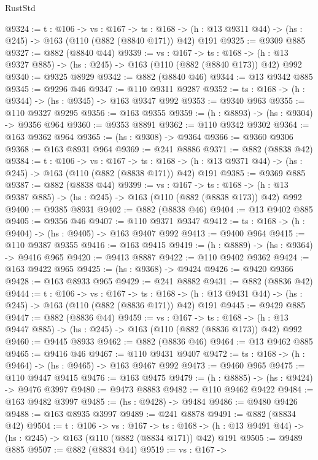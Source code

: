 \begin{lexlean}{RustStd}
\begin{coremodule}
@9324 := {t : @106} ->
  {vs : @167} ->
  {ts : @168} -> (h : @13 @9311 @44) -> (hs : @245) -> @163 (@110 (@882 (@8840 @171)) @42) @191
@9325 := @9309 @885
@9327 := @882 (@8840 @44)
@9339 := {vs : @167} ->
  {ts : @168} -> (h : @13 @9327 @885) -> (hs : @245) -> @163 (@110 (@882 (@8840 @173)) @42) @992
@9340 := @9325 @8929
@9342 := @882 (@8840 @46)
@9344 := @13 @9342 @885
@9345 := @9296 @46
@9347 := @110 @9311 @9287
@9352 := {ts : @168} -> (h : @9344) -> (hs : @9345) -> @163 @9347 @992
@9353 := @9340 @963
@9355 := @110 @9327 @9295
@9356 := @163 @9355
@9359 := (h : @8893) -> (hs : @9304) -> @9356 @964
@9360 := @9353 @8891
@9362 := @110 @9342 @9302
@9364 := @163 @9362 @964
@9365 := (hs : @9308) -> @9364
@9366 := @9360 @9306
@9368 := @163 @8931 @964
@9369 := @241 @8886
@9371 := @882 (@8838 @42)
@9384 := {t : @106} ->
  {vs : @167} ->
  {ts : @168} -> (h : @13 @9371 @44) -> (hs : @245) -> @163 (@110 (@882 (@8838 @171)) @42) @191
@9385 := @9369 @885
@9387 := @882 (@8838 @44)
@9399 := {vs : @167} ->
  {ts : @168} -> (h : @13 @9387 @885) -> (hs : @245) -> @163 (@110 (@882 (@8838 @173)) @42) @992
@9400 := @9385 @8931
@9402 := @882 (@8838 @46)
@9404 := @13 @9402 @885
@9405 := @9356 @46
@9407 := @110 @9371 @9347
@9412 := {ts : @168} -> (h : @9404) -> (hs : @9405) -> @163 @9407 @992
@9413 := @9400 @964
@9415 := @110 @9387 @9355
@9416 := @163 @9415
@9419 := (h : @8889) -> (hs : @9364) -> @9416 @965
@9420 := @9413 @8887
@9422 := @110 @9402 @9362
@9424 := @163 @9422 @965
@9425 := (hs : @9368) -> @9424
@9426 := @9420 @9366
@9428 := @163 @8933 @965
@9429 := @241 @8882
@9431 := @882 (@8836 @42)
@9444 := {t : @106} ->
  {vs : @167} ->
  {ts : @168} -> (h : @13 @9431 @44) -> (hs : @245) -> @163 (@110 (@882 (@8836 @171)) @42) @191
@9445 := @9429 @885
@9447 := @882 (@8836 @44)
@9459 := {vs : @167} ->
  {ts : @168} -> (h : @13 @9447 @885) -> (hs : @245) -> @163 (@110 (@882 (@8836 @173)) @42) @992
@9460 := @9445 @8933
@9462 := @882 (@8836 @46)
@9464 := @13 @9462 @885
@9465 := @9416 @46
@9467 := @110 @9431 @9407
@9472 := {ts : @168} -> (h : @9464) -> (hs : @9465) -> @163 @9467 @992
@9473 := @9460 @965
@9475 := @110 @9447 @9415
@9476 := @163 @9475
@9479 := (h : @8885) -> (hs : @9424) -> @9476 @3997
@9480 := @9473 @8883
@9482 := @110 @9462 @9422
@9484 := @163 @9482 @3997
@9485 := (hs : @9428) -> @9484
@9486 := @9480 @9426
@9488 := @163 @8935 @3997
@9489 := @241 @8878
@9491 := @882 (@8834 @42)
@9504 := {t : @106} ->
  {vs : @167} ->
  {ts : @168} -> (h : @13 @9491 @44) -> (hs : @245) -> @163 (@110 (@882 (@8834 @171)) @42) @191
@9505 := @9489 @885
@9507 := @882 (@8834 @44)
@9519 := {vs : @167} ->

\end{coremodule}
\end{lexlean}
